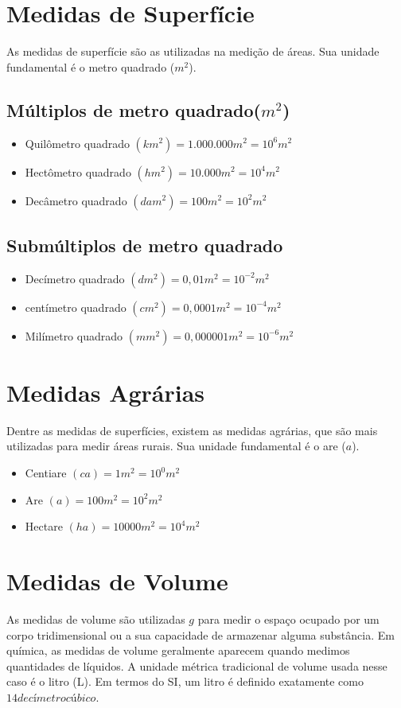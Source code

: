 \section{Medidas de Superfície}
As medidas de superfície são as utilizadas na medição de
áreas. Sua unidade fundamental é o metro quadrado ($m^2$).
    \subsection{Múltiplos de metro quadrado($m^2$)}
		\begin{itemize}
			\item Quilômetro quadrado $(km^2) = 1.000.000 m^2 = 10^6 m^2$
			\item Hectômetro quadrado $(hm^2) = 10.000 m^2 = 10^4 m^2$
			\item Decâmetro quadrado $(dam^2) = 100 m^2 = 10^2 m^2$
		\end{itemize}

	\subsection{Submúltiplos de metro quadrado}
		\begin{itemize}
			\item Decímetro quadrado $(dm^2) = 0,01m^2 = 10^{-2}m^2$
			\item centímetro quadrado $(cm^2) = 0,0001m^2 = 10^{-4}m^2$
			\item Milímetro quadrado $(mm^2)= 0,000001m^2 = 10^{-6}m^2$
		\end{itemize}

\section{Medidas Agrárias}
Dentre as medidas de superfícies, existem as medidas
agrárias, que são mais utilizadas para medir áreas rurais. Sua
unidade fundamental é o are ($a$).
	\begin{itemize}
		\item Centiare $(ca) = 1m^2=10^0m^2$
		\item Are $(a)= 100m^2 = 10^2m^2$
		\item Hectare $(ha) = 10000m^2 = 10^4m^2$
	\end{itemize}

\section{Medidas de Volume} 
As medidas de volume são utilizadas $g$ para medir o espaço ocupado por um corpo tridimensional ou a sua capacidade de armazenar alguma
substância. Em química, as medidas de volume geralmente aparecem quando medimos quantidades de líquidos. A unidade métrica tradicional de volume usada nesse caso é o litro (L). Em termos
do SI, um litro é definido exatamente como $14 decímetro cúbico$.

